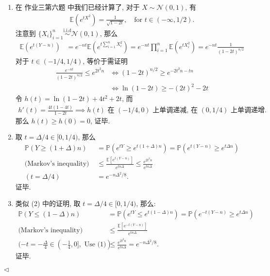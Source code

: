 \documentclass[11pt]{article}
\newenvironment{answer}[1][Solution]{\begin{trivlist}
    \item[\hskip \labelsep {\bfseries #1.}\hskip \labelsep]}{\hfill$\lhd$\end{trivlist}}
\newcommand\1{\mathds{1}}
\newcommand\E{\mathbb{E}}
\newcommand\PP{\mathbb{P}}
\newcommand{\iid}{\overset{\text{i.i.d}}{\sim}}
\begin{document}
\begin{answer}
    \begin{enumerate}[label=(\arabic*)]
        \item 在 作业三第六题 中我们已经计算了, 对于 $X\sim \mathcal{N}(0,1)$, 有
        \begin{align*}
            \E\left(e^{tX^2}\right) = \frac{1}{\sqrt{1-2t}}, \quad \text{for } t\in (-\infty, 1/2).
        \end{align*}
        注意到 $\{X_i\}_{i=1}^n \iid \mathcal{N}(0,1)$, 那么
        \begin{align*}
            \E\left(e^{t(Y-n)}\right) &= e^{-nt} \E\left(e^{t\sum_{i=1}^{n}X_i^2}\right) = e^{-nt} \prod_{i=1}^{n} \E\left(e^{tX_i^2}\right) = e^{-nt} \frac{1}{(1-2t)^{n/2}} 
        \end{align*}
        对于 $t\in (-1/4, 1/4)$, 等价于需证明
        \begin{align*}
            \frac{e^{-nt}}{(1-2t)^{n/2}} \le e^{2t^2n} &\iff (1-2t)^{n/2} \ge e^{-2t^2n-tn} \\
            &\iff \ln(1-2t) \ge -(2t)^2 -2t 
        \end{align*}
        令 $h(t) = \ln(1-2t) + 4t^2 + 2t$, 而
        \begin{align*}
            h'(t) = \frac{4t(1-4t)}{1-2t} \implies h(t) \text{ 在 $(-1/4, 0)$ 上单调递减, 在 $(0, 1/4)$ 上单调递增.}
        \end{align*}
        那么 $h(t) \ge h(0) = 0$, 证毕.
        \item 取 $t = \Delta/4 \in [0, 1/4)$, 那么
        \begin{align*}
            \PP(Y \ge (1+\Delta)n) &= \PP\left(e^{tY} \ge e^{t(1+\Delta)n}\right) = \PP\left(e^{t(Y-n)} \ge e^{t\Delta n}\right) \\
            \text{(Markov's inequality) }&\le \frac{\E\left[e^{t(Y-n)}\right]}{e^{tn\Delta}} \le \frac{e^{2t^2 n}}{e^{tn\Delta}} \\
            (t = \Delta/4)~&= e^{-n\Delta^2/8}.
        \end{align*}
        证毕.
        \item 类似 (2) 中的证明, 取 $t = \Delta/4 \in [0, 1/4)$, 那么:
        \begin{align*}
            \PP(Y \le (1-\Delta)n) &= \PP\left(e^{tY} \le e^{t(1-\Delta)n} \right) = \PP\left(e^{-t(Y-n)} \ge e^{t\Delta n}\right) \\
            \text{(Markov's inequality) }&\le \frac{\E\left[e^{-t(Y-n)}\right]}{e^{tn\Delta}} \\
            (-t = -\frac{\Delta}{4} \in (-\frac{1}{4}, 0], \text{ Use (1)})~ &\le \frac{e^{2t^2 n}}{e^{tn\Delta}} = e^{-n\Delta^2/8}.
        \end{align*} 
        证毕.
    \end{enumerate}
\end{answer}
\end{document}
